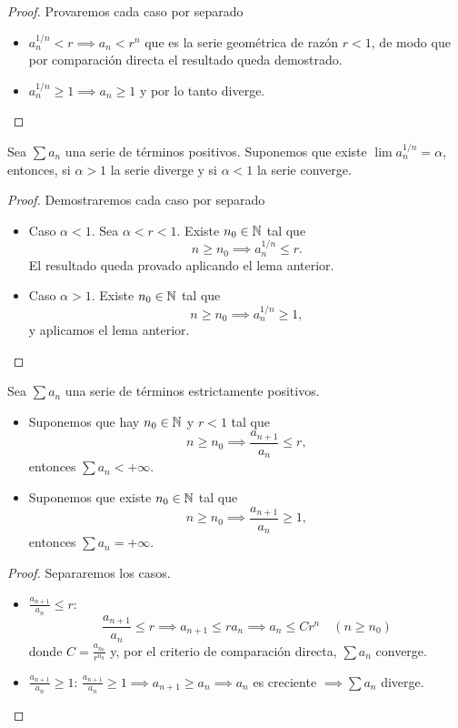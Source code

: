 \begin{proof}
    Provaremos cada caso por separado
    \begin{itemize}
        \item $a_n^{1/n} < r \implies a_n < r^n$ que es la serie geométrica de
        razón $r < 1$, de modo que por comparación directa el resultado queda
        demostrado.
        \item $a_n^{1/n} \geq 1 \implies a_n \geq 1$ y por lo tanto diverge.
    \end{itemize}
\end{proof}

\begin{prop}
    Sea $\sum a_n$ una serie de términos positivos. Suponemos que existe
    $\lim a_n^{1/n} = \alpha$, entonces, si $\alpha > 1$ la serie diverge y si
    $\alpha < 1$ la serie converge.
\end{prop}

\begin{proof}
    Demostraremos cada caso por separado
    \begin{itemize}
        \item Caso $\alpha < 1$. Sea $\alpha < r < 1$. Existe $n_0 \in \mathbb{N}$ tal que
        \[
            n \geq n_0 \implies a_n^{1/n} \leq r.
        \]
        El resultado queda provado aplicando el lema anterior.
        \item Caso $\alpha > 1$. Existe $n_0 \in \mathbb{N}$ tal que
        \[
            n \geq n_0 \implies a_n^{1/n} \geq 1,
        \]
        y aplicamos el lema anterior.
    \end{itemize}
\end{proof}

\begin{lema}
    Sea $\sum a_n$ una serie de términos estrictamente positivos.
    \begin{itemize}
        \item Suponemos que hay $n_0 \in \mathbb{N}$ y $r < 1$ tal que
        \[
            n \geq n_0 \implies \frac{a_{n+1}}{a_n} \leq r,
        \]
        entonces $\sum a_n < + \infty$.
        \item Suponemos que existe $n_0 \in \mathbb{N}$ tal que
        \[
            n \geq n_0 \implies \frac{a_{n+1}}{a_n} \geq 1,
        \]
        entonces $\sum a_n = + \infty$.
    \end{itemize}
\end{lema}

\begin{proof}
    Separaremos los casos.
    \begin{itemize}
        \item $\frac{a_{n+1}}{a_n} \leq r$:
        \[
            \frac{a_{n+1}}{a_n} \leq r \implies a_{n+1} \leq r a_n \implies a_n \leq
            C r^n \quad (n \geq n_0)
        \]
        donde $C = \frac{a_{n_0}}{r^{n_0}}$ y, por el criterio de comparación
        directa, $\sum a_n$ converge.
        \item $\frac{a_{n+1}}{a_n} \geq 1$: $\frac{a_{n+1}}{a_n} \geq 1\implies a_{n+1} \geq a_n \implies a_n$ es creciente
            $\implies \sum a_n$ diverge.
    \end{itemize}
\end{proof}

